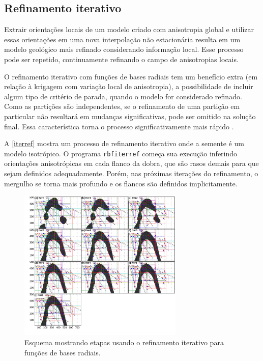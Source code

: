 \subsection{Refinamento iterativo}

Extrair orientações locais de um modelo criado com anisotropia global e utilizar essas orientações em uma nova interpolação não estacionária resulta em um modelo geológico mais refinado considerando informação local. Esse processo pode ser repetido, continuamente refinando o campo de anisotropias locais. 

O refinamento iterativo com funções de bases radiais tem um benefício extra (em relação à krigagem com variação local de anisotropia), a possibilidade de incluir algum tipo de critério de parada, quando o modelo for considerado refinado. Como as partições são independentes, se o refinamento de uma partição em particular não resultará em mudanças significativas, pode ser omitido na solução final. Essa característica torna o processo significativamente mais rápido \cite{martin2017implicitmodeling}.

A \autoref{iterref} mostra um processo de refinamento iterativo onde a semente é um modelo isotrópico. O programa \verb|rbfiterref| começa sua execução inferindo orientações anisotrópicas em cada flanco da dobra, que são rasos demais para que sejam definidos adequadamente. Porém, nas próximas iterações do refinamento, o mergulho se torna mais profundo e os flancos são definidos implicitamente.

\begin{figure}[H]
\caption{\label{iterref} Esquema mostrando etapas usando o refinamento iterativo para funções de bases radiais.}
	\begin{center}
		\includegraphics[width=0.7\textwidth]{capitulo_2/iterref.jpg}
	\end{center}
\end{figure}

